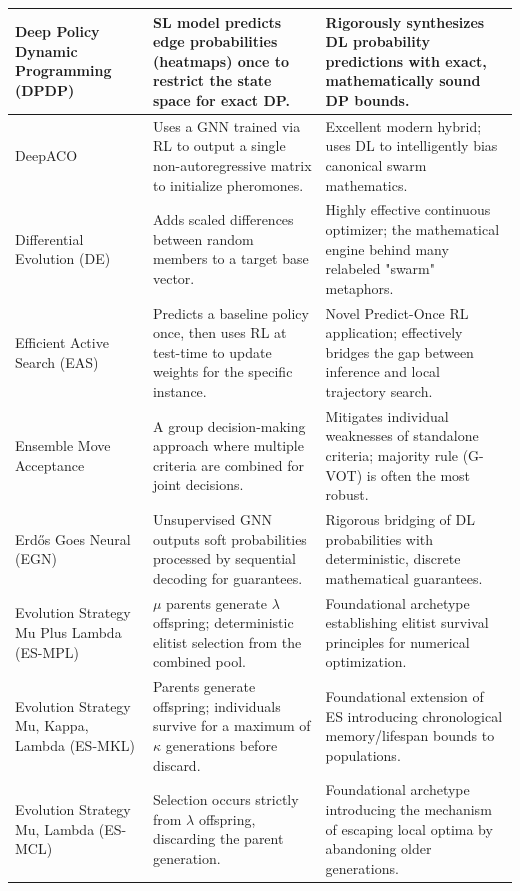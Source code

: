 \begin{center}
\begin{longtable}{
  >{\raggedright\arraybackslash}p{}
  >{\raggedright\arraybackslash}p{}
  >{\raggedright\arraybackslash}p{}
}
Deep Policy Dynamic Programming (DPDP) & SL model predicts edge probabilities (heatmaps) once to restrict the state space for exact DP. & Rigorously synthesizes DL probability predictions with exact, mathematically sound DP bounds. \\ \midrule

DeepACO & Uses a GNN trained via RL to output a single non-autoregressive matrix to initialize pheromones. & Excellent modern hybrid; uses DL to intelligently bias canonical swarm mathematics. \\ \midrule

Differential Evolution (DE) & Adds scaled differences between random members to a target base vector. & Highly effective continuous optimizer; the mathematical engine behind many relabeled "swarm" metaphors. \\ \midrule

Efficient Active Search (EAS) & Predicts a baseline policy once, then uses RL at test-time to update weights for the specific instance. & Novel Predict-Once RL application; effectively bridges the gap between inference and local trajectory search. \\ \midrule

Ensemble Move Acceptance & A group decision-making approach where multiple criteria are combined for joint decisions. & Mitigates individual weaknesses of standalone criteria; majority rule (G-VOT) is often the most robust. \\ \midrule

Erdős Goes Neural (EGN) & Unsupervised GNN outputs soft probabilities processed by sequential decoding for guarantees. & Rigorous bridging of DL probabilities with deterministic, discrete mathematical guarantees. \\ \midrule

Evolution Strategy Mu Plus Lambda (ES-MPL) & $\mu$ parents generate $\lambda$ offspring; deterministic elitist selection from the combined pool. & Foundational archetype establishing elitist survival principles for numerical optimization. \\ \midrule

Evolution Strategy Mu, Kappa, Lambda (ES-MKL) & Parents generate offspring; individuals survive for a maximum of $\kappa$ generations before discard. & Foundational extension of ES introducing chronological memory/lifespan bounds to populations. \\ \midrule

Evolution Strategy Mu, Lambda (ES-MCL) & Selection occurs strictly from $\lambda$ offspring, discarding the parent generation. & Foundational archetype introducing the mechanism of escaping local optima by abandoning older generations. \\ \midrule


\end{longtable}
\end{center}
